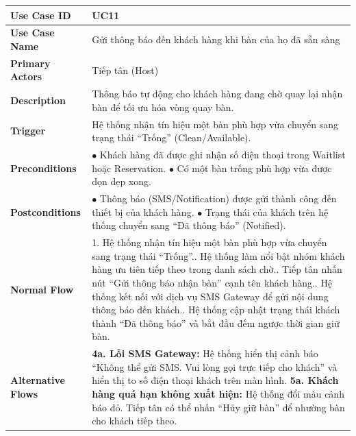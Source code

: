 \begin{longtable}{|L{3.5cm}|L{12.5cm}|}
\hline
\textbf{Use Case ID} & UC11 \\ \hline
\textbf{Use Case Name} & Gửi thông báo đến khách hàng khi bàn của họ đã sẵn sàng \\ \hline
\textbf{Primary Actors} & Tiếp tân (Host) \\ \hline
\textbf{Description} & Thông báo tự động cho khách hàng đang chờ quay lại nhận bàn để tối ưu hóa vòng quay bàn. \\ \hline
\textbf{Trigger} & Hệ thống nhận tín hiệu một bàn phù hợp vừa chuyển sang trạng thái ``Trống'' (Clean/Available). \\ \hline
\textbf{Preconditions} &
$\bullet$ Khách hàng đã được ghi nhận số điện thoại trong Waitlist hoặc Reservation.\newline
$\bullet$ Có một bàn trống phù hợp vừa được dọn dẹp xong. \\ \hline
\textbf{Postconditions} &
$\bullet$ Thông báo (SMS/Notification) được gửi thành công đến thiết bị của khách hàng.\newline
$\bullet$ Trạng thái của khách trên hệ thống chuyển sang ``Đã thông báo'' (Notified). \\ \hline
\textbf{Normal Flow} &
1. Hệ thống nhận tín hiệu một bàn phù hợp vừa chuyển sang trạng thái ``Trống''.. Hệ thống làm nổi bật nhóm khách hàng ưu tiên tiếp theo trong danh sách chờ.. Tiếp tân nhấn nút ``Gửi thông báo nhận bàn'' cạnh tên khách hàng.. Hệ thống kết nối với dịch vụ SMS Gateway để gửi nội dung thông báo đến khách.. Hệ thống cập nhật trạng thái khách thành ``Đã thông báo'' và bắt đầu đếm ngược thời gian giữ bàn. \\ \hline
\textbf{Alternative Flows} &
\textbf{4a. Lỗi SMS Gateway:} Hệ thống hiển thị cảnh báo ``Không thể gửi SMS. Vui lòng gọi trực tiếp cho khách'' và hiển thị to số điện thoại khách trên màn hình.\newline
\textbf{5a. Khách hàng quá hạn không xuất hiện:} Hệ thống đổi màu cảnh báo đỏ. Tiếp tân có thể nhấn ``Hủy giữ bàn'' để nhường bàn cho khách tiếp theo. \\ \hline
\end{longtable}

